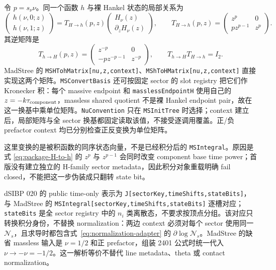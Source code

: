 \documentclass[11pt,a4paper]{ctexart}
\newcommand{\cN}{\mathcal N}
\begin{document}
令 $p=s_\nu\nu$。同一个函数 $h$ 与裸 Hankel 状态的局部关系为
\begin{equation}
 \begin{pmatrix}h(\nu,0;z)\\h(\nu,1;z)\end{pmatrix}
 =T_{H\to h}(p,z)
 \begin{pmatrix}H_\nu(z)\\\partial_zH_\nu(z)\end{pmatrix},
 \qquad
 T_{H\to h}(p,z)=
 \begin{pmatrix}
  z^p&0\\p z^{p-1}&z^p
 \end{pmatrix}.
 \label{eq:package-H-to-h}
\end{equation}
其逆矩阵是
\begin{equation}
 T_{h\to H}(p,z)=
 \begin{pmatrix}
  z^{-p}&0\\-p z^{-p-1}&z^{-p}
 \end{pmatrix},
 \qquad
 T_{h\to H}T_{H\to h}=I_2.
 \label{eq:package-h-to-H}
\end{equation}
MadStree 的 \texttt{MSHTohMatrix[nu,z,context]}、\texttt{MShToHMatrix[nu,z,context]} 直接实现这两个矩阵。\texttt{MSConvertBasis} 还可按固定 sector 的 slot registry 把它们作 Kronecker 积：每个 massive endpoint 和 \texttt{masslessEndpointH} 使用自己的 $z=-k\tau_{\rm component}$，massless shared quotient 不是裸 Hankel endpoint pair，故在这一换基中乘单位矩阵。\texttt{NuConvention} 只在 \texttt{MSInitTree} 时选择；context 建立后，局部矩阵与全 sector 换基都固定读取该值，不接受逐调用覆盖。正/负 prefactor context 均已分别检查正反变换为单位矩阵。

这里变换的是被积函数的同序状态向量，不是已经积分后的 \texttt{MSIntegral}。原因是式 \eqref{eq:package-H-to-h} 的 $z^p$ 与 $z^{p-1}$ 会同时改变 component base time power；首版没有建立独立的 H-family sector metadata，因此积分对象重载明确 fail closed，不能把这一步伪装成只翻转 state bit。

dSIBP 020 的 public time-only 表示为 \texttt{J[sectorKey,timeShifts,stateBits]}，与 MadStree 的 \texttt{MSIntegral[sectorKey,timeShifts,stateBits]} 逐槽对应；\texttt{stateBits} 是全 sector registry 中的 $n_i$ 类离散态，不要求按顶点分组。该对应只转换积分身份，不替换 normalization：两边 context 必须对每个 sector 使用同一 $\cN_s$，且求导时都包含式~\eqref{eq:normalization-adapter} 的 $\partial\log\cN_s$。MadStree 的缺省 massless 输入是 $\nu=1/2$ 和正 prefactor，组装 2401 公式时统一代入 $\nu\to-\nu=-1/2$。这一解析等价不替代 line metadata、theta 或 contact normalization。
\end{document}
